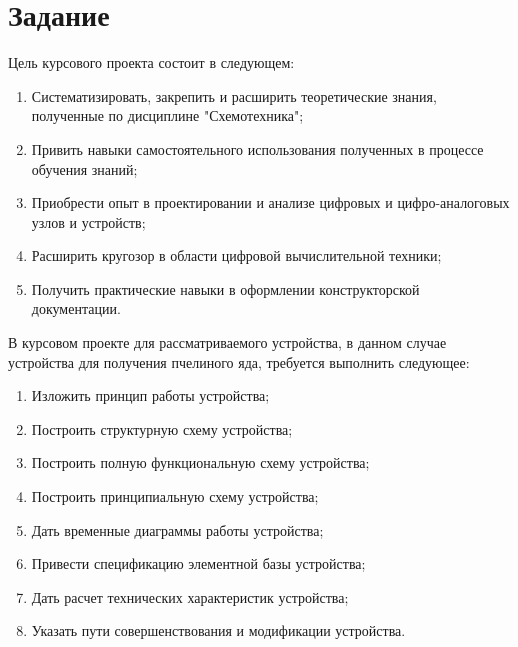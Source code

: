 \section{Задание}
Цель курсового проекта состоит в следующем: 
\begin{enumerate}
	\item Систематизировать, закрепить и расширить теоретические знания, полученные по дисциплине "Схемотехника"; 
	\item Привить навыки самостоятельного использования полученных в процессе обучения знаний; 
	\item Приобрести опыт в проектировании и анализе цифровых и цифро-аналоговых узлов и устройств; 
	\item Расширить кругозор в области цифровой вычислительной техники; 
	\item Получить практические навыки в оформлении конструкторской документации. 
\end{enumerate}

В курсовом проекте для рассматриваемого устройства, в данном случае устройства для получения пчелиного яда, требуется выполнить следующее: 

\begin{enumerate}
		\item Изложить принцип работы устройства; 
		\item Построить структурную схему устройства; 
		\item Построить полную функциональную схему устройства; 
		\item Построить принципиальную схему устройства; 
		\item Дать временные диаграммы работы устройства; 
		\item Привести спецификацию элементной базы устройства; 
		\item Дать расчет технических характеристик устройства; 
		\item Указать пути совершенствования и модификации устройства.
\end{enumerate}
	
